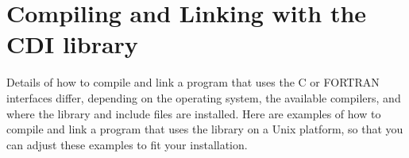 \section{Compiling and Linking with the CDI library}

Details of how to compile and link a program that uses the {\CDI} C or FORTRAN
interfaces differ, depending on the operating system, the available compilers,
and where the {\CDI} library and include files are installed.
Here are examples of how to compile and link a program that uses the {\CDI} library
on a Unix platform, so that you can adjust these examples to fit your installation.
